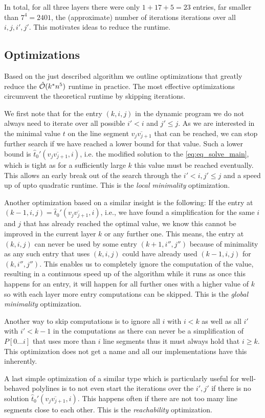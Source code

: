 In total, for all three layers there were only \(1 + 17 + 5 = 23\) entries, far smaller than \(7^4 = 2401\), the (approximate) number of iterations iterations over all \(i, j, i', j'\). This motivates ideas to reduce the runtime.

\subsection{Optimizations}
\label{ssec:optimizations}
Based on the just described algorithm we outline optimizations that greatly reduce the \(\hat{\mathcal{O}}(k^*n^5)\) runtime in practice. The most effective optimizations circumvent the theoretical runtime by skipping iterations. 

We first note that for the entry \((k, i, j)\) in the dynamic program we do not always need to iterate over all possible \(i' < i\) and \(j' \leq j\). As we are interested in the minimal value \(t\) on the line segment \(\overline{v_{j}v_{j+1}}\) that can be reached, we can stop further search if we have reached a lower bound for that value. Such a lower bound is \(\hat t_0'(\overline{v_{j}v_{j+1}}, i)\), i.e. the modified solution to the \cref{eq:eq_solve_main}, which is tight as for a sufficiently large \(k\) this value must be reached eventually. This allows an early break out of the search through the \(i' < i, j'\leq j\) and a speed up of upto quadratic runtime. This is the \emph{local minimality} optimization. 

Another optimization based on a similar insight is the following: If the entry at \((k-1, i, j) = \hat t_0'(\overline{v_{j}v_{j+1}}, i)\), i.e., we have found a simplification for the same \(i\) and \(j\) that has already reached the optimal value, we know this cannot be improved in the current layer \(k\) or any further one. This means, the entry at \((k, i, j)\) can never be used by some entry \((k + 1, i'', j'')\) because of minimality as any such entry that uses \((k, i, j)\) could have already used \((k-1, i, j)\) for \((k, i'', j'')\). This enables us to completely ignore the computation of the value, resulting in a continuous speed up of the algorithm while it runs as once this happens for an entry, it will happen for all further ones with a higher value of \(k\) so with each layer more entry computations can be skipped. This is the \emph{global minimality} optimization.

Another way to skip computations is to ignore all \(i\) with \(i < k\) as well as all \(i'\) with \(i' < k - 1\) in the computations as there can never be a simplification of \(P[0\dots i]\) that uses more than \(i\) line segments thus it must always hold that \(i \geq k\). This optimization does not get a name and all our implementations have this inherently.

A last simple optimization of a similar type which is particularly useful for well-behaved polylines is to not even start the iterations over the \(i', j'\) if there is no solution \(\hat t_0'(\overline{v_{j}v_{j+1}}, i)\). This happens often if there are not too many line segments close to each other. This is the \emph{reachability} optimization. 



